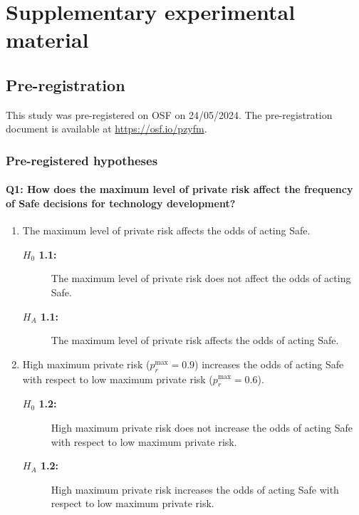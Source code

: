 \documentclass[pdflatex,sn-mathphys-ay]{sn-jnl}
\theoremstyle{thmstyleone}
\theoremstyle{thmstyletwo}
\theoremstyle{thmstylethree}
\begin{document}
\setcounter{section}{0}
\setcounter{subsection}{0}
\setcounter{subsubsection}{0}
\setcounter{figure}{0}
\setcounter{table}{0}

\section{Supplementary experimental material}
\label{si:sec:experimental-material}

\subsection{Pre-registration}
\label{si:sec:prereg}

This study was pre-registered on OSF on 24/05/2024. The pre-registration document is available at \href{https://osf.io/pzyfm}{https://osf.io/pzyfm}.

\subsubsection{Pre-registered hypotheses}
\label{si:sec:prereg-hypotheses}

\paragraph{Q1: How does the maximum level of private risk affect the frequency of Safe decisions for technology development?}

\begin{enumerate}[label={Hypothesis 1.\arabic*:}, labelwidth={90pt}, leftmargin=*]
    \item The maximum level of private risk affects the odds of acting Safe.
    \begin{description}
        \item[\textbf{\(H_0\) 1.1:}] The maximum level of private risk does not affect the odds of acting Safe.
        \item[\textbf{\(H_A\) 1.1:}] The maximum level of private risk affects the odds of acting Safe.
    \end{description}

    \item High maximum private risk (\(p_r^{\max}=0.9\)) increases the odds of acting Safe with respect to low maximum private risk (\(p_r^{\max}=0.6\)).
    \begin{description}
        \item[\textbf{\(H_0\) 1.2:}] High maximum private risk does not increase the odds of acting Safe with respect to low maximum private risk.
        \item[\textbf{\(H_A\) 1.2:}] High maximum private risk increases the odds of acting Safe with respect to low maximum private risk.
    \end{description}
\end{enumerate}
\end{document}
